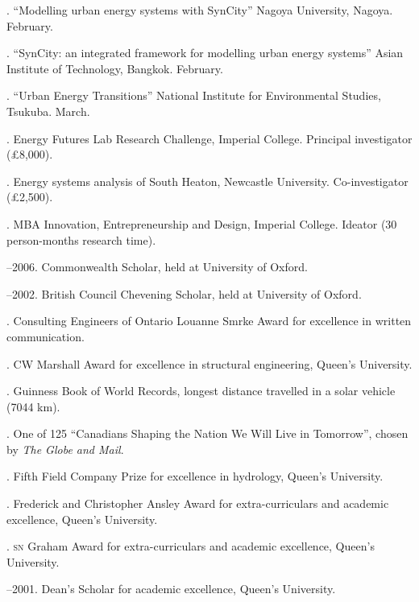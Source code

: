 \documentclass[11pt,a4paper]{article}
\begin{document}
. ``Modelling urban energy systems with SynCity'' Nagoya University, Nagoya. February.

. ``SynCity: an integrated framework for modelling urban energy systems'' Asian Institute of Technology, Bangkok. February.

. ``Urban Energy Transitions'' National Institute for Environmental Studies, Tsukuba.  March.


\bigskip

\noindent{}%
%
. Energy Futures Lab Research Challenge, Imperial College.  Principal investigator (£8,000).


. Energy systems analysis of South Heaton, Newcastle University.  Co-investigator (£2,500).

. MBA Innovation, Entrepreneurship and Design, Imperial College.  Ideator (30 person-months research time).

--2006.  Commonwealth Scholar, held at University of Oxford.

--2002.  British Council Chevening Scholar, held at University of Oxford.

.  Consulting Engineers of Ontario Louanne Smrke Award for excellence in written communication.

. CW Marshall Award for excellence in structural engineering, Queen's University.

.  Guinness Book of World Records, longest distance travelled in a solar vehicle (7044 km).

. One of 125 ``Canadians Shaping the Nation We Will Live in Tomorrow'', chosen by \emph{The Globe and Mail}.

.  Fifth Field Company Prize for excellence in hydrology, Queen's University.

. Frederick and Christopher Ansley Award for extra-curriculars and academic excellence, Queen's University.

.  \textsc{sn} Graham Award for extra-curriculars and academic excellence, Queen's University.

--2001.  Dean's Scholar for academic excellence, Queen's University.
\end{document}
